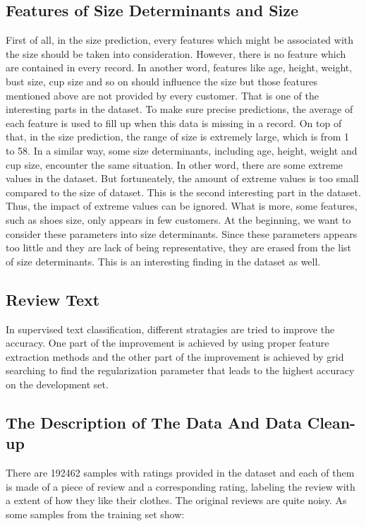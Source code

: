 \documentclass[letterpaper, 10 pt, conference]{ieeeconf}  %
\begin{document}
	\subsection{Features of Size Determinants and Size} 
	First of all, in the size prediction, every features which might be associated with the size should be taken into consideration. However, there is no feature which are contained in every record. In another word, features like age, height, weight, bust size, cup size and so on should influence the size but those features mentioned above are not provided by every customer. That is one of the interesting parts in the dataset. To make sure precise predictions, the average of each feature is used to fill up when this data is missing in a record.
	On top of that, in the size prediction, the range of size is extremely large, which is from 1 to 58. In a similar way, some size determinants, including age, height, weight and cup size, encounter the same situation. In other word, there are some extreme values in the dataset. But fortuneately, the amount of extreme values is too small compared to the size of dataset. This is the second interesting part in the dataset. Thus, the impact of extreme values can be ignored.
	What is more, some features, such as shoes size, only appears in few customers. At the beginning, we want to consider these parameters into size determinants. Since these parameters appears too little and they are lack of being representative, they are erased from the list of size determinants. This is an interesting finding in the dataset as well. 

	\subsection{Review Text}
	In supervised text classification, different stratagies are tried to improve the accuracy. One part of the improvement is achieved by using proper feature extraction methods and the other part of the improvement is achieved by grid searching to find the regularization parameter that leads to the highest accuracy on the development set.
	
	
\subsection{The Description of The Data And Data Clean-up}

There are 192462 samples with ratings provided in the dataset and each of them is made of a piece of review and a corresponding rating, labeling the review with a extent of how they like their clothes.
The original reviews are quite noisy. As some samples from the training set show:
\end{document}
